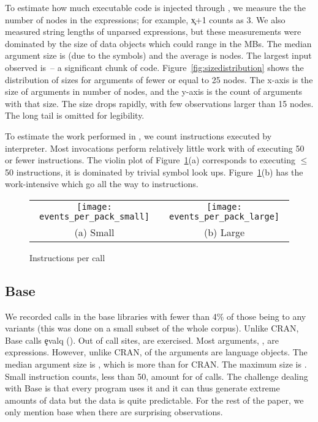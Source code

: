 \documentclass[screen,acmsmall]{acmart}
\begin{document}
To estimate how much executable code is injected through \eval, we measure the
the number of nodes in the expressions; for example, \c{x+1} counts as 3. We
also measured string lengths of unparsed expressions, but these measurements
were dominated by the size of data objects which could range in the MBs. The
median argument size is \packageMedianszeval (due to the symbols) and the
average is \packageAvgszeval nodes. The largest \eval input observed is
\packageMaxszeval\,-- a significant chunk of code.
Figure~\ref{fig:sizedistribution} shows the distribution of sizes for arguments
of fewer or equal to 25 nodes. The x-axis is the size of arguments in number of
nodes, and the y-axis is the count of arguments with that size. The size drops
rapidly, with few observations larger than 15 nodes. The long tail is omitted
for legibility.

To estimate the work performed in \evals, we count instructions executed by
interpreter. Most invocations perform relatively little work with
\packageSmalleventspct of \evals executing 50 or fewer instructions. The violin
plot of Figure~\ref{ev}(a) corresponds to \evals executing $\leq$ 50
instructions, it is dominated by trivial symbol look ups. Figure~\ref{ev}(b) has
the work-intensive \evals which go all the way to \packageMaxeventsRnd
instructions.

\newpage

\begin{figure}[tb!]
\begin{tabular}{@{}c@{}c@{}}
\begin{minipage}{7.5cm}
 \texttt{[image: events\_per\_pack\_small]}
\end{minipage}&\begin{minipage}{7.5cm}
  \texttt{[image: events\_per\_pack\_large]}
\end{minipage}\\[-3mm]
\small (a) Small & \small (b) Large
\end{tabular}
 \caption{Instructions per call} \label{ev}
\end{figure}

\subsection{Base}
We recorded \baseAllcalls \eval calls in the base libraries with fewer than 4\%
of those being to any variants (this was done on a small subset of the whole
corpus). Unlike CRAN, Base calls \c{evalq} (\baseEvalqs). Out of \baseStaticeval
call sites, \baseTriggeredevalpct are exercised. Most arguments,
\baseCodepercent, are expressions. However, unlike CRAN, \baseLanguagepercent of
the arguments are language objects. The median argument size is
\baseMedianszeval, which is more than for CRAN. The maximum size is
\baseMaxszeval. Small instruction counts, less than 50, amount for
\baseSmalleventspct of calls. The challenge dealing with Base is that every
program uses it and it can thus generate extreme amounts of data but the data is
quite predictable. For the rest of the paper, we only mention base when there
are surprising observations.
\end{document}

